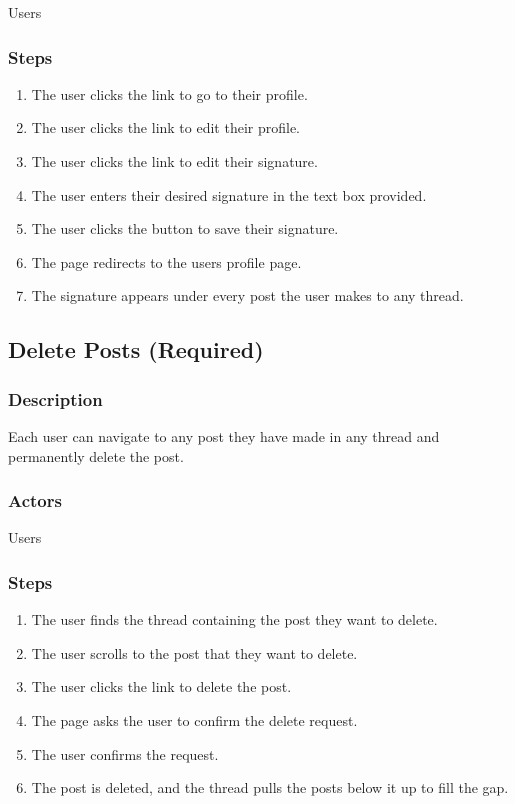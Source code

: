 \documentclass[12pt]{scrartcl}
\begin{document}
Users

\subsubsection{Steps}

\begin{enumerate}
\item The user clicks the link to go to their profile.
\item The user clicks the link to edit their profile.
\item The user clicks the link to edit their signature.
\item The user enters their desired signature in the text box provided.
\item The user clicks the button to save their signature.
\item The page redirects to the users profile page.
\item The signature appears under every post the user makes to any thread.
\end{enumerate}

\subsection{Delete Posts (Required)}
\subsubsection{Description}

Each user can navigate to any post they have made in any thread and permanently delete the post.

\subsubsection{Actors}

Users

\subsubsection{Steps}

\begin{enumerate}
\item The user finds the thread containing the post they want to delete.
\item The user scrolls to the post that they want to delete.
\item The user clicks the link to delete the post.
\item The page asks the user to confirm the delete request.
\item The user confirms the request.
\item The post is deleted, and the thread pulls the posts below it up to fill the gap.
\end{enumerate}
\end{document}
